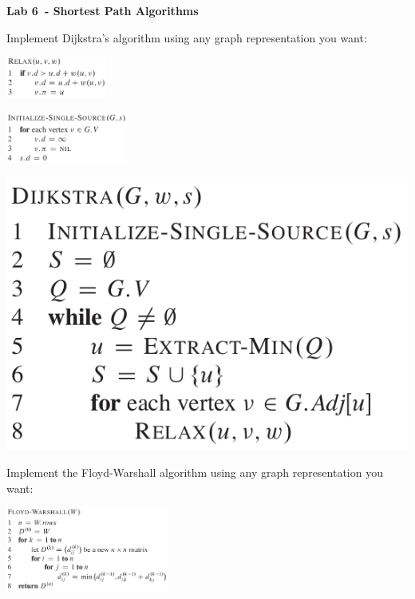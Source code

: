 \documentclass{exam}
\newcommand\labnr{6}
\newcommand\lab{Lab \labnr\ - Shortest Path Algorithms}
\begin{document}
\begin{center}
    \vspace*{0cm}
    \bfseries\LARGE
    \lab
    \vspace*{1cm}
\end{center}


\begin{questions}
\question Implement Dijkstra's algorithm using any graph representation you want: \cite{cormen2022introduction}

\includegraphics[width=0.25\textwidth]{diagrams/relax.png}

\includegraphics[width=0.3\textwidth]{diagrams/initss.png}

\includegraphics{diagrams/dijkstra.png}


\question Implement the Floyd-Warshall algorithm using any graph representation you want: \cite{cormen2022introduction}

\includegraphics[width=0.4\textwidth]{diagrams/floyd.png}


\end{questions}
\end{document}

